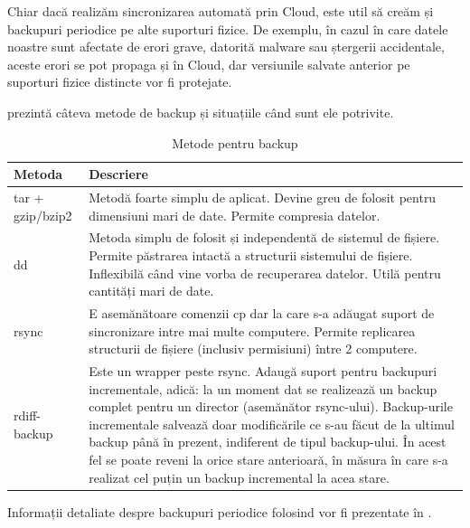Chiar dacă realizăm sincronizarea automată prin Cloud, este util să creăm și backupuri periodice pe alte suporturi fizice.
De exemplu, în cazul în care datele noastre sunt afectate de erori grave, datorită malware sau ștergerii accidentale, aceste erori se pot propaga și în Cloud, dar versiunile salvate anterior pe suporturi fizice distincte vor fi protejate.

 prezintă câteva metode de backup și situațiile când sunt ele
potrivite.

\begin{table}[htb]
  \begin{center}
    \begin{tabular}{ p{} p{} }
      \toprule
        \textbf{Metoda} &
        \textbf{Descriere} \\
      \midrule
        tar + gzip/bzip2 &
        Metodă foarte simplu de aplicat.
        Devine greu de folosit pentru dimensiuni mari de date.
        Permite compresia datelor. \\
      \midrule
        dd &
        Metoda simplu de folosit și independentă de sistemul de fișiere.
        Permite păstrarea intactă a structurii sistemului de fișiere.
        Inflexibilă când vine vorba de recuperarea datelor.
        Utilă pentru cantități mari de date. \\
      \midrule
        rsync &
        E asemănătoare comenzii cp dar la care s-a adăugat suport de sincronizare intre mai multe computere.
        Permite replicarea structurii de fișiere (inclusiv permisiuni) între 2 computere. \\
      \midrule
        rdiff-backup &
        Este un wrapper peste rsync.
        Adaugă suport pentru backupuri incrementale, adică: la un moment dat se realizează un backup complet pentru un director (asemănător rsync-ului).
        Backup-urile incrementale salvează doar modificările ce s-au făcut de la ultimul backup până în prezent, indiferent de tipul backup-ului.
        În acest fel se poate reveni la orice stare anterioară, în măsura în care s-a realizat cel puțin un backup incremental la acea stare. \\
      \bottomrule
    \end{tabular}
  \end{center}
  \caption{Metode pentru backup}
  \label{table:file-system-backup-cmd}
\end{table}

Informații detaliate despre backupuri periodice folosind  vor fi prezentate în .

